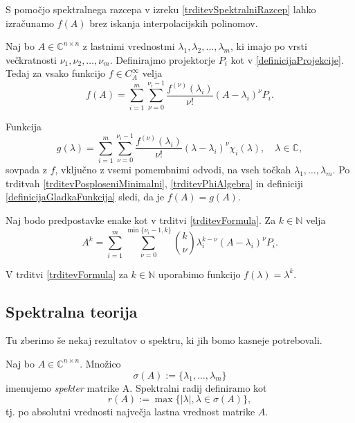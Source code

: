 \documentclass[mat1]{fmfdelo}
\newcommand{\N}{\mathbb N}
\newcommand{\C}{\mathbb C}
\begin{document}
S pomočjo spektralnega razcepa v izreku \ref{trditevSpektralniRazcep} lahko izračunamo $f(A)$ brez iskanja interpolacijskih polinomov.
\begin{izrek} \label{trditevFormula}
    Naj bo $A \in \C^{n \times n}$ z lastnimi vrednostmi $\lambda_1, \lambda_2, \ldots, \lambda_m$, ki imajo po vrsti večkratnosti $\nu_1, \nu_2, \ldots, \nu_m$. Definirajmo projektorje $P_i$ kot v \eqref{definicijaProjekcije}. Tedaj za vsako funkcijo $f \in C_A^\infty$ velja
    \begin{equation*}
        f(A) = \sum_{i=1}^m \sum_{\nu = 0}^{\nu_i - 1} \frac{f^{(\nu)}(\lambda_i)}{\nu !}(A - \lambda_i)^\nu P_i.
    \end{equation*}
\end{izrek}
\begin{dokaz}
    Funkcija
    \begin{equation*}
        g(\lambda) = \sum_{i=1}^m \sum_{\nu = 0}^{\nu_i - 1} \frac{f^{(\nu)}(\lambda_i)}{\nu !}(\lambda - \lambda_i)^\nu \chi_i(\lambda), \quad \lambda \in \C,
    \end{equation*}
    sovpada z $f$, vključno z vsemi pomembnimi odvodi, na vseh točkah $\lambda_1, \ldots, \lambda_m$.  Po trditvah \ref{trditevPosploseniMinimalni}, \ref{trditevPhiAlgebra} in definiciji \ref{definicijaGladkaFunkcija} sledi, da je $f(A) = g(A)$.
\end{dokaz}
\begin{posledica}
    Naj bodo predpostavke enake kot v trditvi \ref{trditevFormula}. Za $k \in \N$ velja
    \begin{equation}\label{formulaMatricnePotence}
        A^k = \sum_{i=1}^m \sum_{\nu = 0}^{\min \{\nu_i - 1, k\}} {k \choose \nu} \lambda_i^{k-\nu}(A - \lambda_i)^\nu P_i.
    \end{equation}
\end{posledica}
\begin{dokaz}
    V trditvi \ref{trditevFormula} za $k \in \N$ uporabimo funkcijo $f(\lambda) = \lambda^k$.
\end{dokaz}

\subsection{Spektralna teorija}
Tu zberimo še nekaj rezultatov o spektru, ki jih bomo kasneje potrebovali.
\begin{definicija}
    Naj bo $A \in \C^{n \times n}$. Množico
    \begin{equation*}
        \sigma(A) := \{\lambda_1, \ldots, \lambda_m\}
    \end{equation*}
    imenujemo \emph{spekter} matrike A. {Spektralni radij} definiramo kot
    \begin{equation*}
        r(A) := \max \{|\lambda|, \lambda \in \sigma(A)\},
    \end{equation*}
    tj. po absolutni vrednosti največja lastna vrednost matrike $A$.
\end{definicija}
\end{document}
